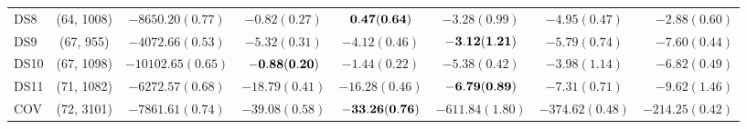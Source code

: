 \begin{table}[t]
\begin{center}
\begin{sc}
{\begin{tabular}{lccccccr}
DS8      & (64, 1008)        & $-8650.20(0.77)$ & $-0.82(0.27)$ & $\bf{0.47}(0.64)$ & $-3.28(0.99)$ & $-4.95(0.47)$ & $-2.88(0.60)$ \\
DS9      & (67, 955)         & $-4072.66(0.53)$ & $-5.32(0.31)$ & $-4.12(0.46)$ & $\bf{-3.12}(1.21)$ & $-5.79(0.74)$ & $-7.60(0.44)$ \\
DS10     & (67, 1098)        & $-10102.65(0.65)$ & $\bf{-0.88}(0.20)$ & $-1.44(0.22)$ & $-5.38(0.42)$ & $-3.98(1.14)$ & $-6.82(0.49)$ \\
DS11     & (71, 1082)        & $-6272.57(0.68)$ & $-18.79(0.41)$ & $-16.28(0.46)$ & $\bf{-6.79}(0.89)$ & $-7.31(0.71)$ & $-9.62(1.46)$ \\
COV      & (72, 3101)        & $-7861.61(0.74)$ & $-39.08(0.58)$ & $\bf{-33.26}(0.76)$ & $-611.84(1.80)$ & $-374.62(0.48)$ & $-214.25(0.42)$ \\
\bottomrule
\end{tabular}}
\end{sc}
\end{center}
\vskip -0.1in
\end{table}


